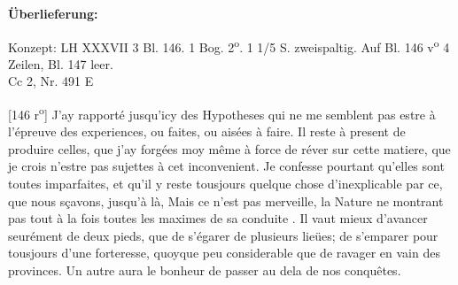       
               
                \begin{ledgroupsized}[r]{120mm}
                \footnotesize 
                \pstart                
                \noindent\textbf{\"{U}berlieferung:}   
                \pend
                \end{ledgroupsized}
            
              
                            \begin{ledgroupsized}[r]{114mm}
                            \footnotesize 
                            \pstart \parindent -6mm
                            Konzept: LH XXXVII 3 Bl. 146. 1 Bog. 2\textsuperscript{o}. 1 1/5 S. zweispaltig. Auf Bl. 146 v\textsuperscript{o} 4 Zeilen, Bl. 147 leer.\\Cc 2, Nr. 491 E \pend
                            \end{ledgroupsized}
                \vspace*{8mm}
                \pstart 
                \normalsize
            [146 r\textsuperscript{o}] J'ay rapport\'{e}  jusqu'icy des Hypotheses qui ne me semblent pas estre \`{a} l'\'{e}preuve  des experiences, ou faites, ou ais\'{e}es \`{a} faire. Il reste \`{a} present de produire celles, que j'ay forg\'{e}es moy même \`{a} force de r\'{e}ver sur cette matiere, que je crois n'estre pas sujettes \`{a} cet inconvenient. Je confesse pourtant qu'elles sont toutes imparfaites, et qu'il y reste tousjours quelque chose d'inexplicable par ce, que nous s\c{c}avons, jusqu'\`{a} l\`{a},  Mais ce n'est pas merveille, la Nature ne montrant pas tout \`{a} la fois toutes les maximes de sa conduite . Il vaut  mieux d'avancer seur\'{e}ment de deux pieds, que de s'\'{e}garer de plusieurs lie\"{u}es; de s'emparer pour tousjours d'une forteresse, quoyque peu considerable que de ravager en vain des provinces. Un autre aura le bonheur de passer au dela de nos conquêtes.\pend
